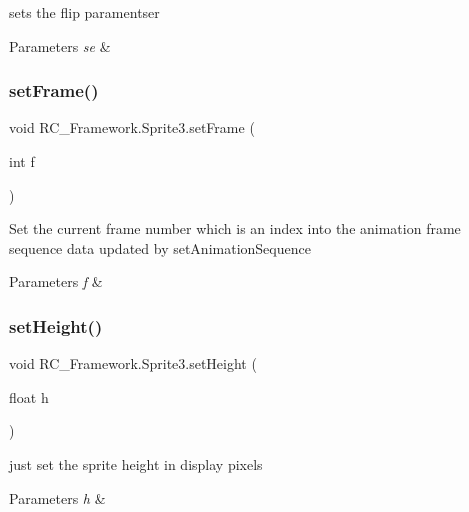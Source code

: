 sets the flip paramentser 


\begin{DoxyParams}{Parameters}
{\em se} & \\
\hline
\end{DoxyParams}
\mbox{\label{class_r_c___framework_1_1_sprite3_a552be0daafb94d0cc7802a10539e5032}} 
\subsubsection{\texorpdfstring{set\+Frame()}{setFrame()}}
{\footnotesize\ttfamily void R\+C\+\_\+\+Framework.\+Sprite3.\+set\+Frame (\begin{DoxyParamCaption}\item[{int}]{f }\end{DoxyParamCaption})}



Set the current frame number which is an index into the animation frame sequence data updated by set\+Animation\+Sequence 


\begin{DoxyParams}{Parameters}
{\em f} & \\
\hline
\end{DoxyParams}
\mbox{\label{class_r_c___framework_1_1_sprite3_ad1f24cf43143791cb73c80a4af1881f0}} 
\subsubsection{\texorpdfstring{set\+Height()}{setHeight()}}
{\footnotesize\ttfamily void R\+C\+\_\+\+Framework.\+Sprite3.\+set\+Height (\begin{DoxyParamCaption}\item[{float}]{h }\end{DoxyParamCaption})}



just set the sprite height in display pixels 


\begin{DoxyParams}{Parameters}
{\em h} & \\
\hline
\end{DoxyParams}
\mbox{\label{class_r_c___framework_1_1_sprite3_a2551e6efc55ccfb3596b0f5bff398fc1}} 
